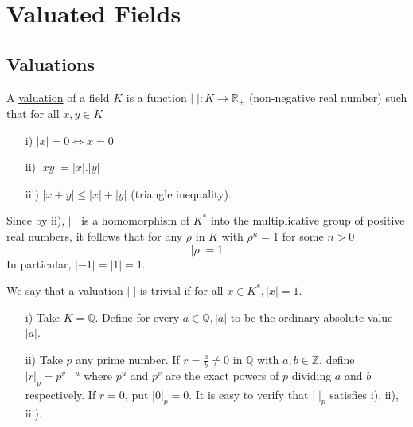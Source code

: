 \chapter*{Valuated Fields}\label{chap0}

\setcounter{section}{0}
\section{Valuations}\pageoriginale\label{sec0.1}

\begin{defi*}
A \underline{valuation} of a field $K$ is a function 
$|\;|:K\rightarrow\mathbb{R}_+$ (non-negative real number) such that 
for all $x,y\in K$
\begin{itemize}
\item[i)] $|x|=0\Leftrightarrow x=0$
\item[ii)] $|xy|=|x|.|y|$
\item[iii)]$|x+y|\leq |x|+|y|$ (triangle inequality).
\end{itemize}
\end{defi*}

\begin{remark*}
Since by ii), $|\;|$ is a homomorphism of $K^*$ into the 
multiplicative group of positive real numbers, it follows that for any 
$\rho$ in $K$ with $\rho^n=1$ for some $n>0$
$$
|\rho|=1
$$
In particular, $|-1|=|1|=1$.
\end{remark*}

We say that a valuation $|\;|$ is \underline{trivial} if for all 
$x\in K^*, |x|=1$.

\begin{examples*}
\begin{itemize}
\item[i)] Take $K=\mathbb{Q}$. Define for every $a\in\mathbb{Q}, |a|$ 
to be the ordinary absolute value $|a|$.
\item[ii)]\label{ex:ii} Take $p$ any prime number. If 
$r=\frac{a}{b}\neq 0$ in 
$\mathbb{Q}$ with $a,b\in\mathbb{Z}$, define $|r|_p=p^{v-u}$ where 
$p^u$ and $p^v$ are the exact powers of $p$ dividing $a$ and $b$ 
respectively. If $r=0$, put $|0|_p=0$. It is easy to verify that 
$|\;|_p$ satisfies i), ii), iii).
\end{itemize}
\end{examples*}

